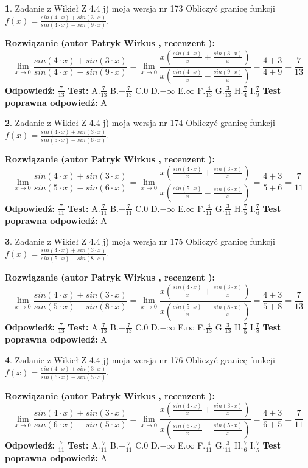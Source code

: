 \documentclass[12pt, a4paper]{article}
\theoremstyle{definition} %
\newtheorem{zad}{}
\newcommand{\zadStart}[1]{\begin{zad}#1\newline}
\newcommand{\zadStop}{\end{zad}}
\newcommand{\rozwStart}[2]{\noindent \textbf{Rozwiązanie (autor #1 , recenzent #2): }\newline}
\newcommand{\rozwStop}{\newline}
\newcommand{\odpStart}{\noindent \textbf{Odpowiedź:}\newline}
\newcommand{\odpStop}{\newline}
\newcommand{\testStart}{\noindent \textbf{Test:}\newline}
\newcommand{\testStop}{\newline}
\newcommand{\kluczStart}{\noindent \textbf{Test poprawna odpowiedź:}\newline}
\newcommand{\kluczStop}{\newline}
\begin{document}
\zadStart{Zadanie z Wikieł Z 4.4 j) moja wersja nr 173}
Obliczyć granicę funkcji $f(x)=\frac{sin(4\cdot x) +sin(3\cdot x)}{sin(4\cdot x) -sin(9\cdot x)}$.
\zadStop
\rozwStart{Patryk Wirkus}{}
$$\lim\limits_{x\to 0}\frac{sin(4\cdot x) +sin(3\cdot x)}{sin(4\cdot x) -sin(9\cdot x)}=\lim\limits_{x\to 0}\frac{x(\frac{sin(4\cdot x)}{x}+\frac{sin(3\cdot x)}{x})}{x(\frac{sin(4\cdot x)}{x}-\frac{sin(9\cdot x)}{x})}=\frac{4+3}{4+9} = \frac{7}{13}$$
\rozwStop
\odpStart
$\frac{7}{13}$
\odpStop
\testStart
A.$\frac{7}{13}$
B.$-\frac{7}{13}$
C.$0$
D.$-\infty$
E.$\infty$
F.$\frac{4}{13}$
G.$\frac{3}{13}$
H.$\frac{7}{4}$
I.$\frac{7}{9}$
\testStop
\kluczStart
A
\kluczStop



\zadStart{Zadanie z Wikieł Z 4.4 j) moja wersja nr 174}
Obliczyć granicę funkcji $f(x)=\frac{sin(4\cdot x) +sin(3\cdot x)}{sin(5\cdot x) -sin(6\cdot x)}$.
\zadStop
\rozwStart{Patryk Wirkus}{}
$$\lim\limits_{x\to 0}\frac{sin(4\cdot x) +sin(3\cdot x)}{sin(5\cdot x) -sin(6\cdot x)}=\lim\limits_{x\to 0}\frac{x(\frac{sin(4\cdot x)}{x}+\frac{sin(3\cdot x)}{x})}{x(\frac{sin(5\cdot x)}{x}-\frac{sin(6\cdot x)}{x})}=\frac{4+3}{5+6} = \frac{7}{11}$$
\rozwStop
\odpStart
$\frac{7}{11}$
\odpStop
\testStart
A.$\frac{7}{11}$
B.$-\frac{7}{11}$
C.$0$
D.$-\infty$
E.$\infty$
F.$\frac{4}{11}$
G.$\frac{3}{11}$
H.$\frac{7}{5}$
I.$\frac{7}{6}$
\testStop
\kluczStart
A
\kluczStop



\zadStart{Zadanie z Wikieł Z 4.4 j) moja wersja nr 175}
Obliczyć granicę funkcji $f(x)=\frac{sin(4\cdot x) +sin(3\cdot x)}{sin(5\cdot x) -sin(8\cdot x)}$.
\zadStop
\rozwStart{Patryk Wirkus}{}
$$\lim\limits_{x\to 0}\frac{sin(4\cdot x) +sin(3\cdot x)}{sin(5\cdot x) -sin(8\cdot x)}=\lim\limits_{x\to 0}\frac{x(\frac{sin(4\cdot x)}{x}+\frac{sin(3\cdot x)}{x})}{x(\frac{sin(5\cdot x)}{x}-\frac{sin(8\cdot x)}{x})}=\frac{4+3}{5+8} = \frac{7}{13}$$
\rozwStop
\odpStart
$\frac{7}{13}$
\odpStop
\testStart
A.$\frac{7}{13}$
B.$-\frac{7}{13}$
C.$0$
D.$-\infty$
E.$\infty$
F.$\frac{4}{13}$
G.$\frac{3}{13}$
H.$\frac{7}{5}$
I.$\frac{7}{8}$
\testStop
\kluczStart
A
\kluczStop



\zadStart{Zadanie z Wikieł Z 4.4 j) moja wersja nr 176}
Obliczyć granicę funkcji $f(x)=\frac{sin(4\cdot x) +sin(3\cdot x)}{sin(6\cdot x) -sin(5\cdot x)}$.
\zadStop
\rozwStart{Patryk Wirkus}{}
$$\lim\limits_{x\to 0}\frac{sin(4\cdot x) +sin(3\cdot x)}{sin(6\cdot x) -sin(5\cdot x)}=\lim\limits_{x\to 0}\frac{x(\frac{sin(4\cdot x)}{x}+\frac{sin(3\cdot x)}{x})}{x(\frac{sin(6\cdot x)}{x}-\frac{sin(5\cdot x)}{x})}=\frac{4+3}{6+5} = \frac{7}{11}$$
\rozwStop
\odpStart
$\frac{7}{11}$
\odpStop
\testStart
A.$\frac{7}{11}$
B.$-\frac{7}{11}$
C.$0$
D.$-\infty$
E.$\infty$
F.$\frac{4}{11}$
G.$\frac{3}{11}$
H.$\frac{7}{6}$
I.$\frac{7}{5}$
\testStop
\kluczStart
A
\kluczStop
\end{document}

